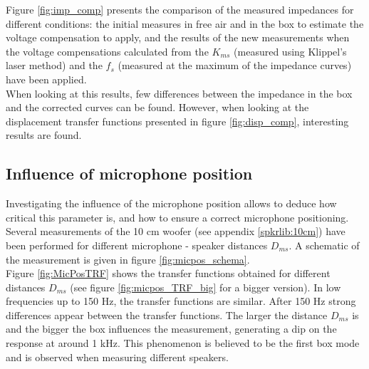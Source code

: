 \documentclass{report}
\begin{document}
Figure \ref{fig:imp_comp} presents the comparison of the measured impedances for different conditions: the initial measures in free air and in the box to estimate the voltage compensation to apply, and the results of the new measurements when the voltage compensations calculated from the $K_{ms}$ (measured using Klippel's laser method) and the $f_{s}$ (measured at the maximum of the impedance curves) have been applied. \\
When looking at this results, few differences between the impedance in the box and the corrected curves can be found. However, when looking at the displacement transfer functions presented in figure \ref{fig:disp_comp}, interesting results are found. \\


\subsection{Influence of microphone position}

Investigating the influence of the microphone position allows to deduce how critical this parameter is, and how to ensure a correct microphone positioning. Several measurements of the 10 cm woofer (see appendix \ref{spkrlib:10cm}) have been performed for different microphone - speaker distances $D_{ms}$. A schematic of the measurement is given in figure \ref{fig:micpos_schema}.  \\

Figure \ref{fig:MicPosTRF} shows the transfer functions obtained for different distances $D_{ms}$ (see figure \ref{fig:micpos_TRF_big} for a bigger version). In low frequencies up to 150 Hz, the transfer functions are similar. After 150 Hz strong differences appear between the transfer functions. The larger the distance $D_{ms}$ is and the bigger the box influences the measurement, generating a dip on the response at around 1 kHz. This phenomenon is believed to be the first box mode and is observed when measuring different speakers. \\
\end{document}
